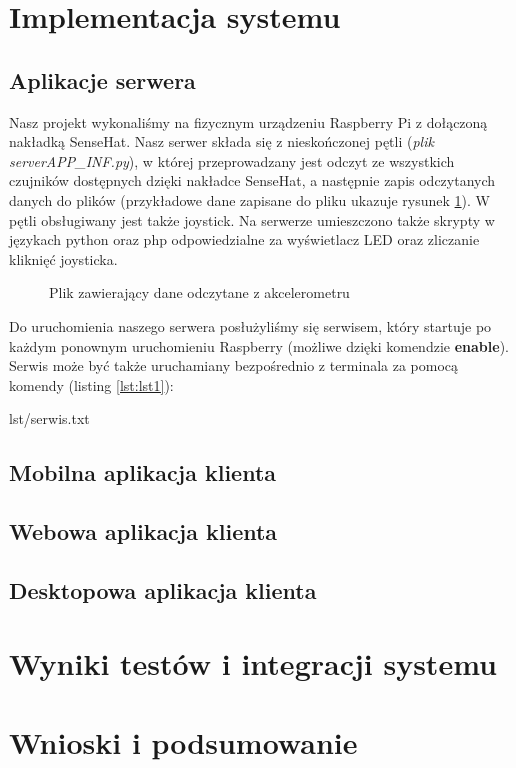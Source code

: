 \documentclass[11pt, a4paper]{article}
\begin{document}
\newpage

\section{Implementacja systemu}

\subsection{Aplikacje serwera}
Nasz projekt wykonaliśmy na fizycznym urządzeniu Raspberry Pi z dołączoną nakładką SenseHat. Nasz serwer składa się z nieskończonej pętli (\textit{plik serverAPP\_INF.py}), w której przeprowadzany jest odczyt ze wszystkich czujników dostępnych dzięki nakładce SenseHat, a następnie zapis odczytanych danych do plików (przykładowe dane zapisane do pliku ukazuje rysunek \ref{fig:fig1}). W pętli obsługiwany jest także joystick. Na serwerze umieszczono także skrypty w językach python oraz php odpowiedzialne za wyświetlacz LED oraz zliczanie kliknięć joysticka. 

\begin{figure}[H]
	\caption{Plik zawierający dane odczytane z akcelerometru}
	\label{fig:fig1}
\end{figure}

Do uruchomienia naszego serwera posłużyliśmy się serwisem, który startuje po każdym ponownym uruchomieniu Raspberry (możliwe dzięki komendzie \textbf{enable}). Serwis może być także uruchamiany bezpośrednio z terminala za pomocą komendy (listing \ref{lst:lst1}):

{lst/serwis.txt}

\subsection{Mobilna aplikacja klienta}

\subsection{Webowa aplikacja klienta}

\subsection{Desktopowa aplikacja klienta}
\newpage
\section{Wyniki testów i integracji systemu}

\newpage

\section{Wnioski i podsumowanie}


\newpage

\printbibliography[heading=bibintoc]
\end{document}
